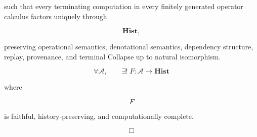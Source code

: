 \documentclass[12pt,oneside]{article}
\theoremstyle{definition}
\theoremstyle{remark}
\begin{document}
such that every terminating computation in every finitely generated operator
calculus factors uniquely through

\[
\mathbf{Hist},
\]

preserving operational semantics, denotational semantics, dependency
structure, replay, provenance, and terminal Collapse up to natural
isomorphism.

\[
\boxed{
\forall
\mathcal A,
\qquad
\exists!\;
F
:
\mathcal A
\longrightarrow
\mathbf{Hist}
}
\]

where

\[
F
\]

is faithful, history-preserving, and computationally complete.

\[
\Box
\]

\newpage

\end{document}
